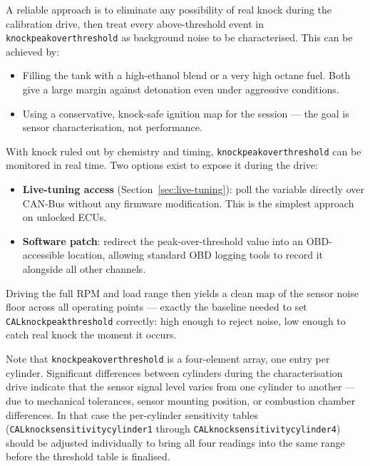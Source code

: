 \documentclass[a4paper,11pt]{article}
\renewcommand{\_}{\oldunderscore\allowbreak}
\begin{document}
A reliable approach is to eliminate any possibility of real knock during the
calibration drive, then treat every above-threshold event in
\texttt{knock\_peak\_over\_threshold} as background noise to be characterised.
This can be achieved by:

\begin{itemize}
    \item Filling the tank with a high-ethanol blend or a very high octane
          fuel. Both give a large margin against detonation even under
          aggressive conditions.
    \item Using a conservative, knock-safe ignition map for the session --- the
          goal is sensor characterisation, not performance.
\end{itemize}

With knock ruled out by chemistry and timing, \texttt{knock\_peak\_over\_threshold}
can be monitored in real time. Two options exist to expose it during the drive:

\begin{itemize}
    \item \textbf{Live-tuning access} (Section~\ref{sec:live-tuning}): poll the
          variable directly over CAN-Bus without any firmware modification.
          This is the simplest approach on unlocked ECUs.
    \item \textbf{Software patch}: redirect the peak-over-threshold value into
          an OBD-accessible location, allowing standard OBD logging tools to
          record it alongside all other channels.
\end{itemize}

Driving the full RPM and load range then yields a clean map of the sensor noise
floor across all operating points --- exactly the baseline needed to set
\texttt{CAL\_knock\_peak\_threshold} correctly: high enough to reject noise,
low enough to catch real knock the moment it occurs.

Note that \texttt{knock\_peak\_over\_threshold} is a four-element array, one
entry per cylinder. Significant differences between cylinders during the
characterisation drive indicate that the sensor signal level varies from one
cylinder to another --- due to mechanical tolerances, sensor mounting
position, or combustion chamber differences. In that case the per-cylinder
sensitivity tables (\texttt{CAL\_knock\_sensitivity\_cylinder1} through
\texttt{CAL\_knock\_sensitivity\_cylinder4}) should be adjusted individually
to bring all four readings into the same range before the threshold table is
finalised.
\end{document}
